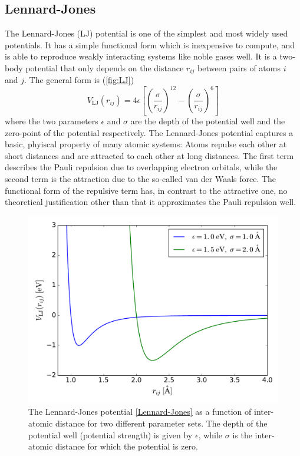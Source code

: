 \documentclass[twoside,english]{uiofysmaster}
\begin{document}
\subsection{Lennard-Jones}
The Lennard-Jones (LJ) potential \cite{Jones24} is one of the simplest and most widely used potentials. 
It has a simple functional form which is inexpensive to compute, and is able to reproduce weakly interacting systems 
like noble gases well. It is a two-body potential that only depends on the distance $r_{ij}$ between pairs of atoms $i$ and $j$. 
The general form is (\autoref{fig:LJ})
\begin{equation}
 V_\mathrm{LJ}(r_{ij}) = 4\epsilon \left[\left(\frac{\sigma}{r_{ij}}\right)^{12} - \left(\frac{\sigma}{r_{ij}}\right)^6\right]
 \label{Lennard-Jones}
\end{equation}
where the two parameters $\epsilon$ and $\sigma$ are the depth of the potential well and the zero-point of the potential respectively.
The Lennard-Jones potential captures a basic, phyiscal property of many atomic systems: Atoms repulse each other at short distances
and are attracted to each other at long distances. The first term describes the Pauli repulsion due to overlapping electron orbitals, 
while the second term is the attraction due to the so-called van der Waals force. 
The functional form of the repulsive term has, in contrast to the attractive one, no theoretical justification other than that
it approximates the Pauli repulsion well. 
\begin{figure}
\centering
 \includegraphics[width = 0.7\linewidth]{Figures/Theory/LJ.pdf}
 \caption{The Lennard-Jones potential \eqref{Lennard-Jones} as a function of inter-atomic distance for two different parameter sets. 
 The depth of the potential well (potential
 strength) is given by $\epsilon$, while $\sigma$ is the inter-atomic distance for which the potential is zero.}
 \label{fig:LJ}
\end{figure}
\end{document}
